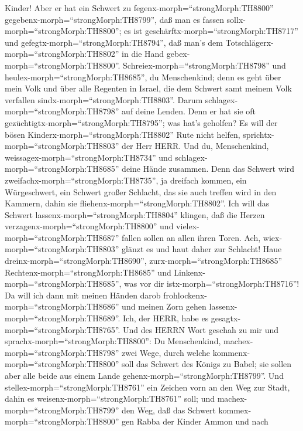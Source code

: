 Kinder!  Aber er hat ein Schwert zu
fegenx-morph=``strongMorph:TH8800''
gegebenx-morph=``strongMorph:TH8799'', daß man es fassen
sollx-morph=``strongMorph:TH8800''; es ist
geschärftx-morph=``strongMorph:TH8717'' und
gefegtx-morph=``strongMorph:TH8794'', daß man's dem
Totschlägerx-morph=``strongMorph:TH8802'' in die Hand
gebex-morph=``strongMorph:TH8800''. 
Schreiex-morph=``strongMorph:TH8798'' und
heulex-morph=``strongMorph:TH8685'', du Menschenkind; denn es geht über
mein Volk und über alle Regenten in Israel, die dem Schwert samt meinem
Volk verfallen sindx-morph=``strongMorph:TH8803''. Darum
schlagex-morph=``strongMorph:TH8798'' auf deine Lenden. 
Denn er hat sie oft gezüchtigtx-morph=``strongMorph:TH8795''; was hat's
geholfen? Es will der bösen Kinderx-morph=``strongMorph:TH8802'' Rute
nicht helfen, sprichtx-morph=``strongMorph:TH8803'' der Herr HERR.
 Und du, Menschenkind,
weissagex-morph=``strongMorph:TH8734'' und
schlagex-morph=``strongMorph:TH8685'' deine Hände zusammen. Denn das
Schwert wird zweifachx-morph=``strongMorph:TH8735'', ja dreifach kommen,
ein Würgeschwert, ein Schwert großer Schlacht, das sie auch treffen wird
in den Kammern, dahin sie fliehenx-morph=``strongMorph:TH8802''.
 Ich will das Schwert lassenx-morph=``strongMorph:TH8804''
klingen, daß die Herzen verzagenx-morph=``strongMorph:TH8800'' und
vielex-morph=``strongMorph:TH8687'' fallen sollen an allen ihren Toren.
Ach, wiex-morph=``strongMorph:TH8803'' glänzt es und haut daher zur
Schlacht!  Haue dreinx-morph=``strongMorph:TH8690'',
zurx-morph=``strongMorph:TH8685'' Rechtenx-morph=``strongMorph:TH8685''
und Linkenx-morph=``strongMorph:TH8685'', was vor dir
istx-morph=``strongMorph:TH8716''!  Da will ich dann mit
meinen Händen darob frohlockenx-morph=``strongMorph:TH8686'' und meinen
Zorn gehen lassenx-morph=``strongMorph:TH8689''. Ich, der HERR, habe es
gesagtx-morph=``strongMorph:TH8765''.  Und des HERRN Wort
geschah zu mir und sprachx-morph=``strongMorph:TH8800'': 
Du Menschenkind, machex-morph=``strongMorph:TH8798'' zwei Wege, durch
welche kommenx-morph=``strongMorph:TH8800'' soll das Schwert des Königs
zu Babel; sie sollen aber alle beide aus einem Lande
gehenx-morph=``strongMorph:TH8799''.  Und
stellex-morph=``strongMorph:TH8761'' ein Zeichen vorn an den Weg zur
Stadt, dahin es weisenx-morph=``strongMorph:TH8761'' soll; und
machex-morph=``strongMorph:TH8799'' den Weg, daß das Schwert
kommex-morph=``strongMorph:TH8800'' gen Rabba der Kinder Ammon und nach

